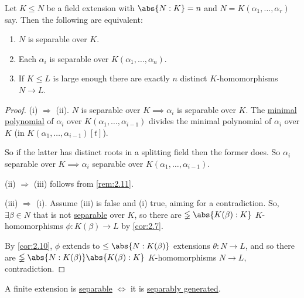 \documentclass{article}
\begin{document}
\begin{nlemma}\label{lem:2.12}
    Let $K \leq N$ be a field extension with $\abs{N:K} = n$ and $N = K(\alpha_1, \dotsc, \alpha_r)$ say.
    Then the following are equivalent:
    \begin{enumerate}[label=(\roman*)]
        \item $N$ is separable over $K$.
        \item Each $\alpha_i$ is separable over $K(\alpha_1, \dotsc, \alpha_n)$.
        \item If $K \leq L$ is large enough there are exactly $n$ distinct $K$-homomorphisms $N \to L$.
    \end{enumerate}
\end{nlemma}

\begin{proof}
    (i) $\Rightarrow$ (ii).
    $N$ is separable over $K \implies  \alpha_i$ is separable over $K$.
    The \hyperlink{def:minPoly}{minimal polynomial} of $\alpha_i$ over $K(\alpha_1, \dotsc, \alpha_{i-1})$ divides the minimal polynomial of $\alpha_i$ over $K$ (in $K(\alpha_1, \dotsc, \alpha_{i-1})[t]$).

    So if the latter has distinct roots in a splitting field then the former does.
    So $\alpha_i$ separable over $K \implies \alpha_i$ separable over $K(\alpha_1, \dotsc, \alpha_{i-1})$.

    (ii) $\Rightarrow$ (iii) follows from \cref{rem:2.11}.

    (iii) $\Rightarrow$ (i). Assume (iii) is false and (i) true, aiming for a contradiction.
    So, $\exists \beta \in N$ that is not \hyperlink{def:separableExt}{separable} over $K$, so there are $\lneqq\abs{K(\beta):K}$ $K$-homomorphisms $\phi:K(\beta) \to L$ by \cref{cor:2.7}.

    By \cref{cor:2.10}, $\phi$ extends to $\leq \abs{N:K(\beta)}$ extensions $\theta: N \to L$, and so there are $\lneqq\abs{N:K(\beta)}\abs{K(\beta):K}$ $K$-homomorphisms $N\to L$, contradiction.
\end{proof}


\begin{ncor}\label{cor:2.14}
    A finite extension is \hyperlink{def:separableExt}{separable} $\iff$ it is \hyperlink{def:separableGen}{separably generated}.
\end{ncor}
\end{document}
